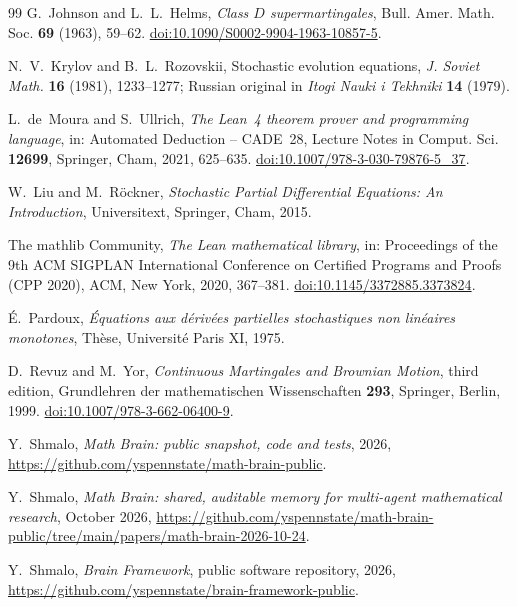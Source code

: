 \documentclass[11pt]{amsart}
\theoremstyle{remark}
\begin{document}
\begin{thebibliography}{99}
G.~Johnson and L.~L.~Helms,
\emph{Class $D$ supermartingales},
Bull. Amer. Math. Soc. \textbf{69} (1963), 59--62.
\href{https://doi.org/10.1090/S0002-9904-1963-10857-5}{doi:10.1090/S0002-9904-1963-10857-5}.

N.~V.~Krylov and B.~L.~Rozovskii,
Stochastic evolution equations,
\emph{J. Soviet Math.} \textbf{16} (1981), 1233--1277; Russian original in \emph{Itogi Nauki i Tekhniki} \textbf{14} (1979).

L.~de~Moura and S.~Ullrich,
\emph{The Lean~4 theorem prover and programming language},
in: Automated Deduction -- CADE~28, Lecture Notes in Comput. Sci. \textbf{12699}, Springer, Cham, 2021, 625--635.
\href{https://doi.org/10.1007/978-3-030-79876-5_37}{doi:10.1007/978-3-030-79876-5\_37}.

W.~Liu and M.~R\"ockner,
\emph{Stochastic Partial Differential Equations: An Introduction},
Universitext, Springer, Cham, 2015.

The mathlib Community,
\emph{The Lean mathematical library},
in: Proceedings of the 9th ACM SIGPLAN International Conference on Certified Programs and Proofs (CPP 2020), ACM, New York, 2020, 367--381.
\href{https://doi.org/10.1145/3372885.3373824}{doi:10.1145/3372885.3373824}.

\'E.~Pardoux,
\emph{\'Equations aux d\'eriv\'ees partielles stochastiques non lin\'eaires monotones},
Th\`ese, Universit\'e Paris XI, 1975.

D.~Revuz and M.~Yor,
\emph{Continuous Martingales and Brownian Motion}, third edition,
Grundlehren der mathematischen Wissenschaften \textbf{293}, Springer, Berlin, 1999.
\href{https://doi.org/10.1007/978-3-662-06400-9}{doi:10.1007/978-3-662-06400-9}.

 Y.~Shmalo, \emph{Math Brain: public snapshot, code and tests}, 2026, \url{https://github.com/yspennstate/math-brain-public}.

 Y.~Shmalo, \emph{Math Brain: shared, auditable memory for multi-agent mathematical research}, October 2026, \url{https://github.com/yspennstate/math-brain-public/tree/main/papers/math-brain-2026-10-24}.

 Y.~Shmalo, \emph{Brain Framework}, public software repository, 2026, \url{https://github.com/yspennstate/brain-framework-public}.

\end{thebibliography}
\end{document}
